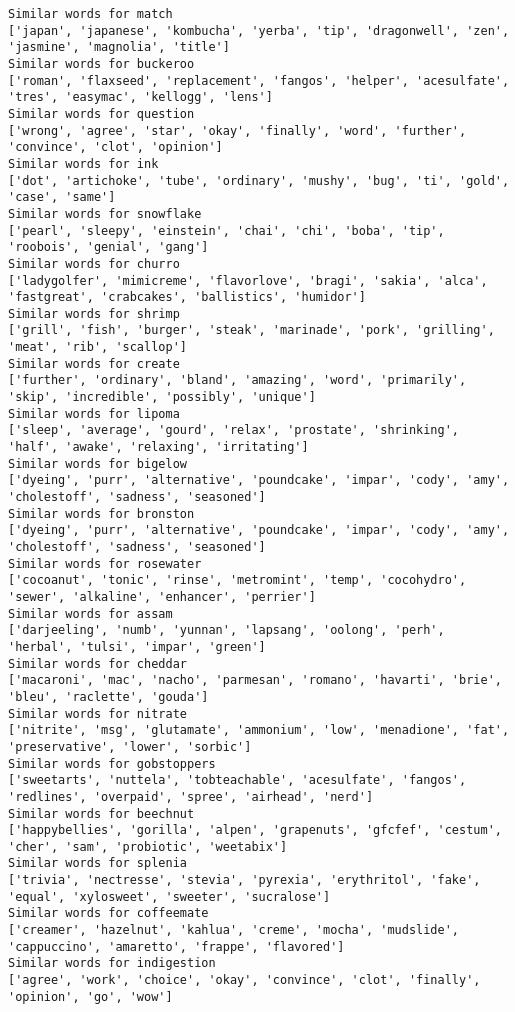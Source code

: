 \documentclass[11pt]{article}
\begin{document}
\begin{Verbatim}[commandchars=\\\{\}]
Similar words for match
['japan', 'japanese', 'kombucha', 'yerba', 'tip', 'dragonwell', 'zen', 'jasmine', 'magnolia', 'title']
Similar words for buckeroo
['roman', 'flaxseed', 'replacement', 'fangos', 'helper', 'acesulfate', 'tres', 'easymac', 'kellogg', 'lens']
Similar words for question
['wrong', 'agree', 'star', 'okay', 'finally', 'word', 'further', 'convince', 'clot', 'opinion']
Similar words for ink
['dot', 'artichoke', 'tube', 'ordinary', 'mushy', 'bug', 'ti', 'gold', 'case', 'same']
Similar words for snowflake
['pearl', 'sleepy', 'einstein', 'chai', 'chi', 'boba', 'tip', 'roobois', 'genial', 'gang']
Similar words for churro
['ladygolfer', 'mimicreme', 'flavorlove', 'bragi', 'sakia', 'alca', 'fastgreat', 'crabcakes', 'ballistics', 'humidor']
Similar words for shrimp
['grill', 'fish', 'burger', 'steak', 'marinade', 'pork', 'grilling', 'meat', 'rib', 'scallop']
Similar words for create
['further', 'ordinary', 'bland', 'amazing', 'word', 'primarily', 'skip', 'incredible', 'possibly', 'unique']
Similar words for lipoma
['sleep', 'average', 'gourd', 'relax', 'prostate', 'shrinking', 'half', 'awake', 'relaxing', 'irritating']
Similar words for bigelow
['dyeing', 'purr', 'alternative', 'poundcake', 'impar', 'cody', 'amy', 'cholestoff', 'sadness', 'seasoned']
Similar words for bronston
['dyeing', 'purr', 'alternative', 'poundcake', 'impar', 'cody', 'amy', 'cholestoff', 'sadness', 'seasoned']
Similar words for rosewater
['cocoanut', 'tonic', 'rinse', 'metromint', 'temp', 'cocohydro', 'sewer', 'alkaline', 'enhancer', 'perrier']
Similar words for assam
['darjeeling', 'numb', 'yunnan', 'lapsang', 'oolong', 'perh', 'herbal', 'tulsi', 'impar', 'green']
Similar words for cheddar
['macaroni', 'mac', 'nacho', 'parmesan', 'romano', 'havarti', 'brie', 'bleu', 'raclette', 'gouda']
Similar words for nitrate
['nitrite', 'msg', 'glutamate', 'ammonium', 'low', 'menadione', 'fat', 'preservative', 'lower', 'sorbic']
Similar words for gobstoppers
['sweetarts', 'nuttela', 'tobteachable', 'acesulfate', 'fangos', 'redlines', 'overpaid', 'spree', 'airhead', 'nerd']
Similar words for beechnut
['happybellies', 'gorilla', 'alpen', 'grapenuts', 'gfcfef', 'cestum', 'cher', 'sam', 'probiotic', 'weetabix']
Similar words for splenia
['trivia', 'nectresse', 'stevia', 'pyrexia', 'erythritol', 'fake', 'equal', 'xylosweet', 'sweeter', 'sucralose']
Similar words for coffeemate
['creamer', 'hazelnut', 'kahlua', 'creme', 'mocha', 'mudslide', 'cappuccino', 'amaretto', 'frappe', 'flavored']
Similar words for indigestion
['agree', 'work', 'choice', 'okay', 'convince', 'clot', 'finally', 'opinion', 'go', 'wow']

\end{Verbatim}
\end{document}
